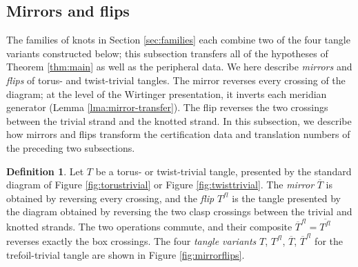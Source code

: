 \documentclass{article}
\theoremstyle{plain}
\theoremstyle{definition}
\newtheorem{definition}[theorem]{Definition}
\theoremstyle{plain}
\theoremstyle{plain}
\theoremstyle{plain}
\theoremstyle{remark}
\theoremstyle{remark}
\theoremstyle{plain}
\theoremstyle{plain}
\newcounter{main}
\theoremstyle{plain}
\theoremstyle{plain}
\begin{document}
\subsection{Mirrors and flips}\label{subsec:mirrors}

The families of knots in Section \ref{sec:families} each combine two of the four tangle variants constructed below; this subsection transfers all of the hypotheses of Theorem \ref{thm:main} as well as the peripheral data. We here describe \emph{mirrors} and \emph{flips} of torus- and twist-trivial tangles. The mirror reverses every crossing of the diagram; at the level of the Wirtinger presentation, it inverts each meridian generator (Lemma \ref{lma:mirror-transfer}). The flip reverses the two crossings between the trivial strand and the knotted strand. In this subsection, we describe how mirrors and flips transform the certification data and translation numbers of the preceding two subsections.

\begin{definition}\label{def:decorations}
Let $T$ be a torus- or twist-trivial tangle, presented by the standard diagram of Figure \ref{fig:torustrivial} or Figure \ref{fig:twisttrivial}. The \emph{mirror} $\overline{T}$ is obtained by reversing every crossing, and the \emph{flip} $T^{fl}$ is the tangle presented by the diagram obtained by reversing the two clasp crossings between the trivial and knotted strands. The two operations commute, and their composite $\overline{T}^{fl} = \overline{T^{fl}}$ reverses exactly the box crossings. The four \emph{tangle variants} $T$, $T^{fl}$, $\overline{T}$, $\overline{T}^{fl}$ for the trefoil-trivial tangle are shown in Figure \ref{fig:mirrorflips}. 
\end{definition}
\end{document}
